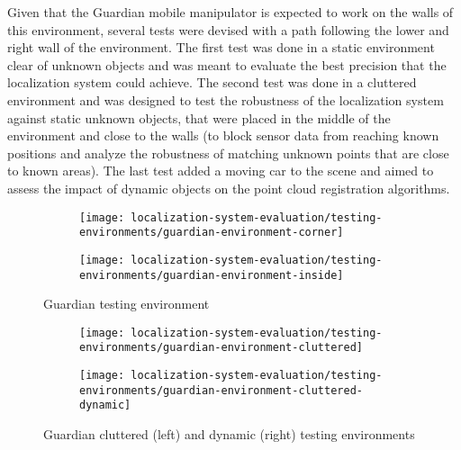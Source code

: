 Given that the Guardian mobile manipulator is expected to work on the walls of this environment, several tests were devised with a path following the lower and right wall of the environment. The first test was done in a static environment clear of unknown objects and was meant to evaluate the best precision that the localization system could achieve. The second test was done in a cluttered environment and was designed to test the robustness of the localization system against static unknown objects, that were placed in the middle of the environment and close to the walls (to block sensor data from reaching known positions and analyze the robustness of matching unknown points that are close to known areas). The last test added a moving car to the scene and aimed to assess the impact of dynamic objects on the point cloud registration algorithms.


\begin{figure}[ht]
	\centering
	\begin{subfigure}[ht]{0.3\textwidth}
		\centering
		\texttt{[image: localization-system-evaluation/testing-environments/guardian-environment-corner]}
	\end{subfigure}
	\begin{subfigure}[ht]{0.3\textwidth}
		\centering
		\texttt{[image: localization-system-evaluation/testing-environments/guardian-environment-inside]}
	\end{subfigure}
	\caption{Guardian testing environment}
	\label{fig:localization-system-evaluation_guardian-tests-environment}
\end{figure}

\begin{figure}[ht]
	\centering
	\begin{subfigure}[ht]{0.32\textwidth}
		\centering
		\texttt{[image: localization-system-evaluation/testing-environments/guardian-environment-cluttered]}
	\end{subfigure}
	\begin{subfigure}[ht]{0.32\textwidth}
		\centering
		\texttt{[image: localization-system-evaluation/testing-environments/guardian-environment-cluttered-dynamic]}
	\end{subfigure}
	\caption{Guardian cluttered (left) and dynamic (right) testing environments}
	\label{fig:localization-system-evaluation_guardian-tests-environment-cluttered}
\end{figure}



